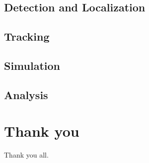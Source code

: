 \documentclass{scrbook}
\begin{document}
\section{Detection and Localization}

\section{Tracking}

\section{Simulation}

\section{Analysis}

\chapter{Thank you}
Thank you all.
\end{document}
